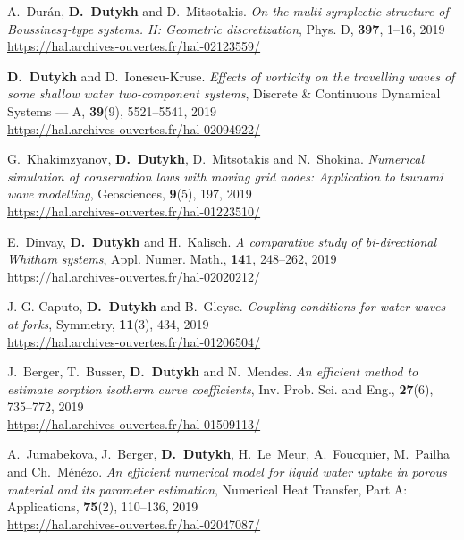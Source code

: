 \begin{etaremune}
  \item A.~Dur\'{a}n, \textbf{D.~Dutykh} and D.~Mitsotakis. \textit{On the multi-symplectic structure of Boussinesq-type systems. II: Geometric discretization}, Phys. D, \textbf{397}, 1--16, 2019 \\ %
  \url{https://hal.archives-ouvertes.fr/hal-02123559/}
  
  \item \textbf{D.~Dutykh} and D.~Ionescu-Kruse. \textit{Effects of vorticity on the travelling waves of some shallow water two-component systems}, Discrete \& Continuous Dynamical Systems --- A, \textbf{39}(9), 5521--5541, 2019 \\ %
  \url{https://hal.archives-ouvertes.fr/hal-02094922/}
  
  \item G.~Khakimzyanov, \textbf{D.~Dutykh}, D.~Mitsotakis and N.~Shokina. \textit{Numerical simulation of conservation laws with moving grid nodes: Application to tsunami wave modelling}, Geosciences, \textbf{9}(5), 197, 2019 \\ %
  \url{https://hal.archives-ouvertes.fr/hal-01223510/}

  \item E.~Dinvay, \textbf{D.~Dutykh} and H.~Kalisch. \textit{A comparative study of bi-directional Whitham systems}, Appl. Numer. Math., \textbf{141}, 248--262, 2019 \\ %
  \url{https://hal.archives-ouvertes.fr/hal-02020212/}
  
  \item J.-G. Caputo, \textbf{D.~Dutykh} and B.~Gleyse. \textit{Coupling conditions for water waves at forks}, Symmetry, \textbf{11}(3), 434, 2019 \\ %
  \url{https://hal.archives-ouvertes.fr/hal-01206504/}
  
  \item J.~Berger, T.~Busser, \textbf{D.~Dutykh} and N.~Mendes. \textit{An efficient method to estimate sorption isotherm curve coefficients},  Inv. Prob. Sci. and Eng., \textbf{27}(6), 735--772, 2019 \\ %
  \url{https://hal.archives-ouvertes.fr/hal-01509113/}
  
  \item A.~Jumabekova, J.~Berger, \textbf{D.~Dutykh}, H.~Le~Meur, A.~Foucquier, M.~Pailha and Ch.~M\'en\'ezo. \textit{An efficient numerical model for liquid water uptake in porous material and its parameter estimation}, Numerical Heat Transfer, Part A: Applications, \textbf{75}(2), 110--136, 2019 \\ %
  \url{https://hal.archives-ouvertes.fr/hal-02047087/}
  

\end{etaremune}
